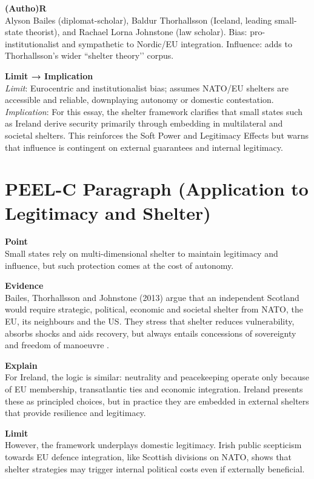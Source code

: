 \textbf{(Autho)R} \\
Alyson Bailes (diplomat-scholar), Baldur Thorhallsson (Iceland, leading small-state theorist), and Rachael Lorna Johnstone (law scholar). Bias: pro-institutionalist and sympathetic to Nordic/EU integration. Influence: adds to Thorhallsson’s wider ``shelter theory’’ corpus.

\textbf{Limit → Implication} \\
\textit{Limit}: Eurocentric and institutionalist bias; assumes NATO/EU shelters are accessible and reliable, downplaying autonomy or domestic contestation. \\
\textit{Implication}: For this essay, the shelter framework clarifies that small states such as Ireland derive security primarily through embedding in multilateral and societal shelters. This reinforces the Soft Power and Legitimacy Effects but warns that influence is contingent on external guarantees and internal legitimacy.

\section*{PEEL-C Paragraph (Application to Legitimacy and Shelter)}

\textbf{Point} \\
Small states rely on multi-dimensional shelter to maintain legitimacy and influence, but such protection comes at the cost of autonomy.  

\textbf{Evidence} \\
Bailes, Thorhallsson and Johnstone (2013) argue that an independent Scotland would require strategic, political, economic and societal shelter from NATO, the EU, its neighbours and the US. They stress that shelter reduces vulnerability, absorbs shocks and aids recovery, but always entails concessions of sovereignty and freedom of manoeuvre \parencite{BAILES_2013}.  

\textbf{Explain} \\
For Ireland, the logic is similar: neutrality and peacekeeping operate only because of EU membership, transatlantic ties and economic integration. Ireland presents these as principled choices, but in practice they are embedded in external shelters that provide resilience and legitimacy.  

\textbf{Limit} \\
However, the framework underplays domestic legitimacy. Irish public scepticism towards EU defence integration, like Scottish divisions on NATO, shows that shelter strategies may trigger internal political costs even if externally beneficial.  

